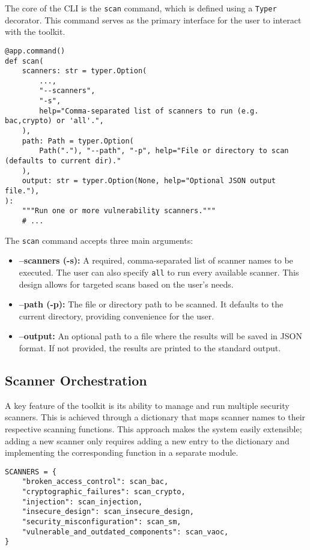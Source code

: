 The core of the CLI is the \texttt{scan} command, which is defined using a \texttt{Typer} decorator. This command serves as the primary interface for the user to interact with the toolkit.

\begin{verbatim}
@app.command()
def scan(
    scanners: str = typer.Option(
        ...,
        "--scanners",
        "-s",
        help="Comma-separated list of scanners to run (e.g. bac,crypto) or 'all'.",
    ),
    path: Path = typer.Option(
        Path("."), "--path", "-p", help="File or directory to scan (defaults to current dir)."
    ),
    output: str = typer.Option(None, help="Optional JSON output file."),
):
    """Run one or more vulnerability scanners."""
    # ...
\end{verbatim}

The \texttt{scan} command accepts three main arguments:
\begin{itemize}
    \item \textbf{--scanners (-s):} A required, comma-separated list of scanner names to be executed. The user can also specify \texttt{all} to run every available scanner. This design allows for targeted scans based on the user's needs.
    \item \textbf{--path (-p):} The file or directory path to be scanned. It defaults to the current directory, providing convenience for the user.
    \item \textbf{--output:} An optional path to a file where the results will be saved in JSON format. If not provided, the results are printed to the standard output.
\end{itemize}

\subsection{Scanner Orchestration}

A key feature of the toolkit is its ability to manage and run multiple security scanners. This is achieved through a dictionary that maps scanner names to their respective scanning functions. This approach makes the system easily extensible; adding a new scanner only requires adding a new entry to the dictionary and implementing the corresponding function in a separate module.

\begin{verbatim}
SCANNERS = {
    "broken_access_control": scan_bac,
    "cryptographic_failures": scan_crypto,
    "injection": scan_injection,
    "insecure_design": scan_insecure_design,
    "security_misconfiguration": scan_sm,
    "vulnerable_and_outdated_components": scan_vaoc,
}
\end{verbatim}

